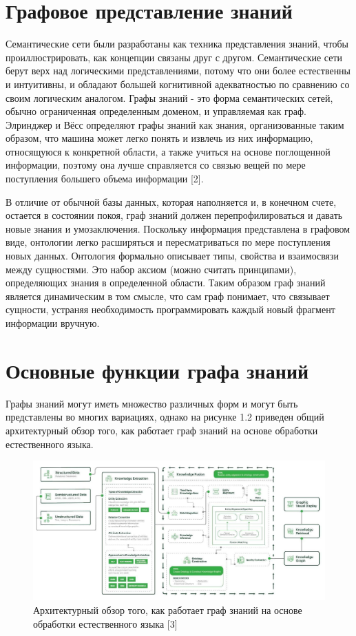\section{Графовое представление знаний}

Семантические сети были разработаны как техника представления знаний, чтобы проиллюстрировать, как концепции связаны друг с другом.
Семантические сети берут верх над логическими представлениями, потому что они более естественны и интуитивны, и обладают большей когнитивной
адекватностью по сравнению со своим логическим аналогом. Графы знаний - это форма семантических сетей, обычно ограниченная определенным
доменом, и управляемая как граф. Элринджер и Вёсс определяют графы знаний как знания, организованные таким образом, что машина может легко
понять и извлечь из них информацию, относящуюся к конкретной области, а также учиться на основе поглощенной информации, поэтому она лучше
справляется со связью вещей по мере поступления большего объема информации [2].

В отличие от обычной базы данных, которая наполняется и, в конечном счете, остается в состоянии покоя, граф знаний должен перепрофилироваться
и давать новые знания и умозаключения. Поскольку информация представлена в графовом виде, онтологии легко расширяться и пересматриваться
по мере поступления новых данных. Онтология формально описывает типы, свойства и взаимосвязи между сущностями. Это набор аксиом (можно
считать принципами), определяющих знания в определенной области. Таким образом граф знаний является динамическим в том смысле, что сам граф
понимает, что связывает сущности, устраняя необходимость программировать каждый новый фрагмент информации вручную.


\section{Основные функции графа знаний}

Графы знаний могут иметь множество различных форм и могут быть представлены во многих вариациях, однако на рисунке 1.2 приведен общий
архитектурный обзор того, как работает граф знаний на основе обработки естественного языка.

\begin{figure}[ht!]
    \center
    \includegraphics [scale=0.32] {my_folder/myimg//2}
    \caption{Архитектурный обзор того, как работает граф знаний на основе обработки естественного языка [3]}
\end{figure}

